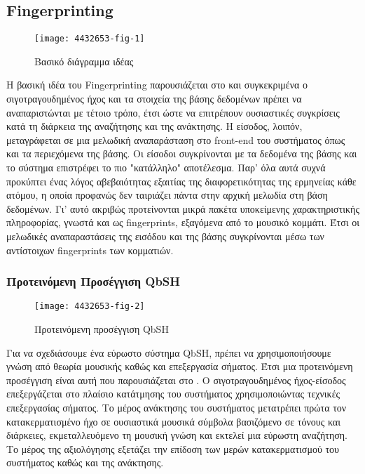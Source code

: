 \newcommand*{\fp}{Fingerprinting}%
\newcommand*{\fps}{fingerprints}%
\subsection{\fp{}}\label{sub:fingerprinting}


\begin{wrapfigure}{r}{0.5\textwidth}
	\centering
	\vspace{-20pt}\texttt{[image: 4432653-fig-1]}
	\vspace{-20pt}\caption{Βασικό διάγραμμα ιδέας}
	\label{fig:4432653-fig-1}
\end{wrapfigure}
Η βασική ιδέα του Fingerprinting\cite{fingerapproach2008} παρουσιάζεται στο 
και συγκεκριμένα ο σιγοτραγουδημένος ήχος και τα στοιχεία της βάσης δεδομένων
πρέπει να αναπαριστώνται με τέτοιο τρόπο, έτσι ώστε να επιτρέπουν ουσιαστικές
συγκρίσεις κατά τη διάρκεια της αναζήτησης και της ανάκτησης. Η είσοδος, λοιπόν,
μεταγράφεται σε μια μελωδική αναπαράσταση στο front-end του συστήματος όπως και
τα περιεχόμενα της βάσης. Οι είσοδοι συγκρίνονται με τα δεδομένα της βάσης και
το σύστημα επιστρέφει το πιο "κατάλληλο" αποτέλεσμα. Παρ' όλα αυτά συχνά
προκύπτει ένας λόγος αβεβαιότητας εξαιτίας της διαφορετικότητας της ερμηνείας
κάθε ατόμου, η οποία προφανώς δεν ταιριάζει πάντα στην αρχική μελωδία στη βάση
δεδομένων. Γι' αυτό ακριβώς προτείνονται μικρά πακέτα υποκείμενης χαρακτηριστικής
πληροφορίας, γνωστά και ως \fps{}, εξαγόμενα από το μουσικό κομμάτι. Έτσι οι
μελωδικές αναπαραστάσεις της εισόδου και της βάσης συγκρίνονται μέσω των
αντίστοιχων \fps{} των κομματιών.

\subsubsection{Προτεινόμενη Προσέγγιση QbSH}
\begin{wrapfigure}{r}{0.5\textwidth}
	\centering
	\vspace{-20pt}\texttt{[image: 4432653-fig-2]}
	\vspace{-20pt}\caption{Προτεινόμενη προσέγγιση QbSH}
	\label{fig:4432653-fig-2}
\end{wrapfigure}
Για να σχεδιάσουμε ένα εύρωστο σύστημα QbSH, πρέπει να χρησιμοποιήσουμε γνώση
από θεωρία μουσικής καθώς και επεξεργασία σήματος. Έτσι μια προτεινόμενη
προσέγγιση είναι αυτή που παρουσιάζεται στο . Ο
σιγοτραγουδημένος ήχος-είσοδος επεξεργάζεται στο πλαίσιο κατάτμησης του
συστήματος χρησιμοποιώντας τεχνικές επεξεργασίας σήματος. Το μέρος ανάκτησης
του συστήματος μετατρέπει πρώτα τον κατακερματισμένο ήχο σε ουσιαστικά μουσικά
σύμβολα βασιζόμενο σε τόνους και διάρκειες, εκμεταλλευόμενο τη μουσική γνώση
και εκτελεί μια εύρωστη αναζήτηση. Το μέρος της αξιολόγησης εξετάζει την
επίδοση των μερών κατακερματισμού του συστήματος καθώς και της ανάκτησης.

